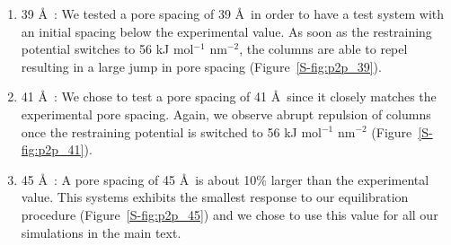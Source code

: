 
	\begin{enumerate}

	\item 39 \AA~: We tested a pore spacing of 39 \AA~in order to
	have a test system with an initial spacing below the experimental value. As soon
	as the restraining potential switches to 56 kJ mol$^{-1}$ nm$^{-2}$, the
	columns are able to repel resulting in a large jump in pore spacing
	(Figure~\ref{S-fig:p2p_39}). %

		\item 41 \AA~: We chose to test a pore spacing of 41 \AA~since
	it closely matches the experimental pore spacing. Again, we observe abrupt
	repulsion of columns once the restraining potential is switched to 56 kJ
	mol$^{-1}$ nm$^{-2}$ (Figure~\ref{S-fig:p2p_41}). %

		\item 45 \AA~: A pore spacing of 45 \AA~is about 10\% larger
	than the experimental value. This systems exhibits the smallest response to our 
 		equilibration procedure (Figure~\ref{S-fig:p2p_45}) and we chose to use this
        value for all our simulations in the main text.


\end{enumerate}
